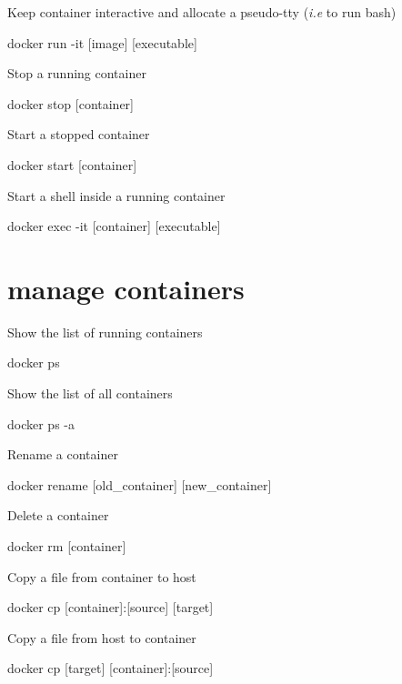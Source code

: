 \documentclass{refcard}
\begin{document}
Keep container interactive and allocate a pseudo-tty (\textit{i.e} to run bash)
\begin{ttyenv}
docker run -it [image] [executable] 
\end{ttyenv}

Stop a running container
\begin{ttyenv}
docker stop [container]
\end{ttyenv}

Start a stopped container
\begin{ttyenv}
docker start [container]
\end{ttyenv}

Start a shell inside a running container
\begin{ttyenv}
docker exec -it [container] [executable]
\end{ttyenv}


\section{manage containers}

Show the list of running containers
\begin{ttyenv}
docker ps
\end{ttyenv}

Show the list of all containers
\begin{ttyenv}
docker ps -a
\end{ttyenv}

Rename a container
\begin{ttyenv}
docker rename [old_container] [new_container]
\end{ttyenv}

Delete a container
\begin{ttyenv}
docker rm [container]
\end{ttyenv}

Copy a file from container to host
\begin{ttyenv}
docker cp [container]:[source] [target]
\end{ttyenv}

Copy a file from host to container
\begin{ttyenv}
docker cp [target] [container]:[source] 
\end{ttyenv}
\vspace{4em}

\end{document}
